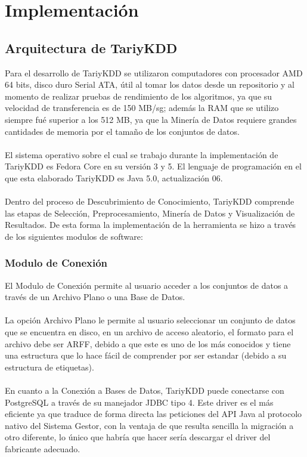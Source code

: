 \section{Implementaci\'on}
\subsection{Arquitectura de TariyKDD}
Para el desarrollo de TariyKDD se utilizaron computadores con procesador AMD 64 bits, disco duro Serial ATA,
\'util  al tomar los datos desde un repositorio y al momento de realizar pruebas de rendimiento de los
algoritmos, ya que su velocidad de transferencia es de 150 MB/sg; adem\'as la RAM que se utilizo siempre fu\'e
superior a los 512 MB, ya que la Miner\'ia de Datos requiere grandes cantidades de memoria por el tama\~no de
los conjuntos de datos.\\
\\
El sistema operativo sobre el cual se trabajo durante la implementaci\'on de TariyKDD es Fedora Core en su
versi\'on 3 y 5. El lenguaje de programaci\'on en el que esta elaborado TariyKDD es Java 5.0, 
actualizaci\'on 06.\\
\\
Dentro del proceso de Descubrimiento de Conocimiento, TariyKDD comprende las etapas de Selecci\'on,
Preprocesamiento, Miner\'ia de Datos y Visualizaci\'on de Resultados. De esta forma la implementaci\'on de la
herramienta se hizo a trav\'es de los siguientes modulos de software:

\subsubsection{Modulo de Conexi\'on}
El Modulo de Conexi\'on permite al usuario acceder a los conjuntos de datos a trav\'es de un Archivo Plano o
una Base de Datos.\\
\\
La opci\'on Archivo Plano le permite al usuario seleccionar un conjunto de datos que se encuentra en disco, en un
archivo de acceso aleatorio, el formato para el archivo debe ser ARFF\cite{arff}, debido a que este es uno de los
m\'as conocidos y tiene una estructura que lo hace f\'acil de comprender por ser estandar (debido a su estructura
de etiquetas).\\
\\
En cuanto a la Conexi\'on a Bases de Datos, TariyKDD puede conectarse con PostgreSQL a trav\'es de su manejador
JDBC tipo 4. Este driver es el m\'as eficiente ya que traduce de forma directa las peticiones del API Java al
protocolo nativo del Sistema Gestor, con la ventaja de que resulta sencilla la migraci\'on a otro diferente, lo
\'unico que habr\'ia que hacer ser\'ia descargar el driver del fabricante adecuado.

